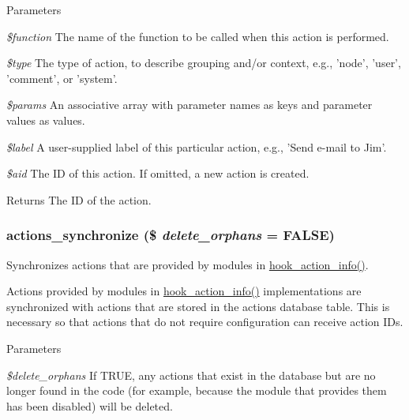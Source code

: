 \begin{DoxyParams}{Parameters}
\item[{\em \$function}]The name of the function to be called when this action is performed. \item[{\em \$type}]The type of action, to describe grouping and/or context, e.g., 'node', 'user', 'comment', or 'system'. \item[{\em \$params}]An associative array with parameter names as keys and parameter values as values. \item[{\em \$label}]A user-\/supplied label of this particular action, e.g., 'Send e-\/mail to Jim'. \item[{\em \$aid}]The ID of this action. If omitted, a new action is created.\end{DoxyParams}
\begin{DoxyReturn}{Returns}
The ID of the action. 
\end{DoxyReturn}
\hypertarget{actions_8inc_a139190d8981f8e48be78b24d2adaab1c}{
\subsubsection[{actions\_\-synchronize}]{\setlength{\rightskip}{0pt plus 5cm}actions\_\-synchronize (\$ {\em delete\_\-orphans} = {\ttfamily FALSE})}}
\label{actions_8inc_a139190d8981f8e48be78b24d2adaab1c}
Synchronizes actions that are provided by modules in \hyperlink{group__actions_ga3df26c5d6496c91fcd0edd8648023fb4}{hook\_\-action\_\-info()}.

Actions provided by modules in \hyperlink{group__actions_ga3df26c5d6496c91fcd0edd8648023fb4}{hook\_\-action\_\-info()} implementations are synchronized with actions that are stored in the actions database table. This is necessary so that actions that do not require configuration can receive action IDs.


\begin{DoxyParams}{Parameters}
\item[{\em \$delete\_\-orphans}]If TRUE, any actions that exist in the database but are no longer found in the code (for example, because the module that provides them has been disabled) will be deleted. \end{DoxyParams}
